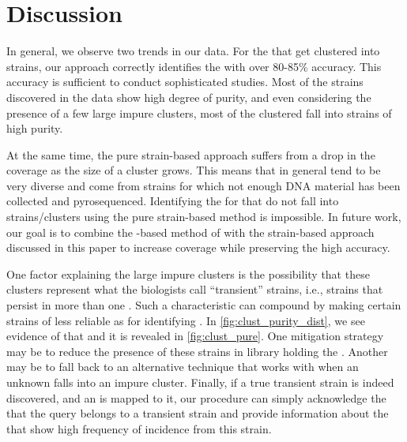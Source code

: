 \section{Discussion}\label{sec:discussion:clustering}

In general, we observe two trends in our data. For the \isols{} that get clustered into strains,
our approach correctly identifies the \spec{} with over 80-85\% accuracy. This accuracy
is sufficient to conduct sophisticated \mst{} studies. Most of the strains discovered 
in the \cplop{} data show high degree of purity, and even considering the presence of 
a few large impure clusters, most of the clustered \isols{} fall into strains of high purity.


At the same time, the pure strain-based approach suffers from a drop in the coverage as the size of a cluster grows. 
This means that in general \cplop{} \isols{} tend to be very diverse
and come from strains for which not enough DNA material has been collected and pyrosequenced.
Identifying the \spec{} for \isols{} that do not fall into strains/clusters using the pure strain-based
method is impossible. In future work, our goal is to combine the \kNN{}-based \mst{} method
of \cite{DBLP:conf/bibm/McGovernDKBVG15} with the strain-based approach discussed in this paper
to increase coverage while preserving the high \mst{} accuracy.







One factor explaining the large impure clusters is the possibility that these
clusters represent what the  biologists call  ``transient'' strains, i.e., strains that 
persist in more than one \spec{}. 
Such a characteristic can compound \mst{} by making certain strains of \ecoli{} less reliable as \fib{} for identifying \spec{}.
In \autoref{fig:clust_purity_dist}, we see evidence of that and it is revealed in \autoref{fig:clust_pure}.
One mitigation strategy may be to reduce the presence of these strains in library holding the \fib{}.
Another may be to fall back to an alternative \mst{} technique that works with \cplop{} when an unknown \isol{} falls into an impure cluster.  Finally, if a true transient strain is indeed
discovered, and an \isol{} is mapped to it, our \mst{} procedure can simply acknowledge the
that the query \isol{} belongs to a transient strain and provide information about the \spec{}
that show high frequency of \ecoli{} incidence from this strain.



